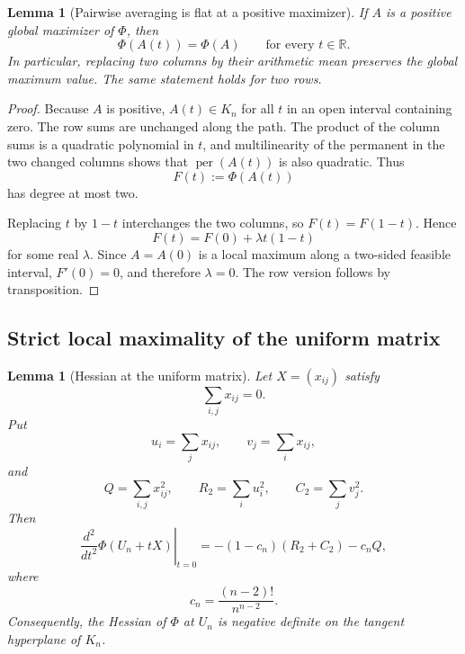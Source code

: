 \documentclass[11pt]{article}
\newtheorem{lemma}[theorem]{Lemma}
\theoremstyle{definition}
\newcommand{\per}{\operatorname{per}}
\newcommand{\1}{\mathbf{1}}
\begin{document}
\begin{lemma}[Pairwise averaging is flat at a positive maximizer]\label{lem:flat-average}
If $A$ is a positive global maximizer of $\Phi$, then
\[
 \Phi(A(t))=\Phi(A)
 \qquad\text{for every }t\in\mathbb R.
 \tag{4.2}\label{eq:flat-path}
\]
In particular, replacing two columns by their arithmetic mean preserves the global maximum value.  The same statement holds for two rows.
\end{lemma}

\begin{proof}
Because $A$ is positive, $A(t)\in K_n$ for all $t$ in an open interval containing zero.  The row sums are unchanged along the path.  The product of the column sums is a quadratic polynomial in $t$, and multilinearity of the permanent in the two changed columns shows that $\per(A(t))$ is also quadratic.  Thus
\[
 F(t):=\Phi(A(t))
\]
has degree at most two.

Replacing $t$ by $1-t$ interchanges the two columns, so $F(t)=F(1-t)$.  Hence
\[
 F(t)=F(0)+\lambda t(1-t)
\]
for some real $\lambda$.  Since $A=A(0)$ is a local maximum along a two-sided feasible interval, $F'(0)=0$, and therefore $\lambda=0$.  The row version follows by transposition.
\end{proof}

\subsection{Strict local maximality of the uniform matrix}

\begin{lemma}[Hessian at the uniform matrix]\label{lem:hessian}
Let $X=(x_{ij})$ satisfy
\[
 \sum_{i,j}x_{ij}=0.
\]
Put
\[
 u_i=\sum_jx_{ij},
 \qquad
 v_j=\sum_ix_{ij},
\]
and
\[
 Q=\sum_{i,j}x_{ij}^2,
 \qquad
 R_2=\sum_i u_i^2,
 \qquad
 C_2=\sum_jv_j^2.
\]
Then
\[
 \left.\frac{d^2}{dt^2}\Phi(U_n+tX)\right|_{t=0}
 =-(1-c_n)(R_2+C_2)-c_nQ,
 \tag{4.3}\label{eq:hessian}
\]
where
\[
 c_n=\frac{(n-2)!}{n^{n-2}}.
\]
Consequently, the Hessian of $\Phi$ at $U_n$ is negative definite on the tangent hyperplane of $K_n$.
\end{lemma}
\end{document}
